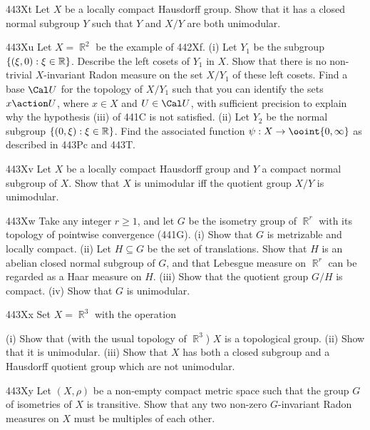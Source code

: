 {\spheader 443Xt Let $X$ be a locally compact Hausdorff group.   Show
that it has a closed normal subgroup $Y$ such that $Y$ and $X/Y$ are
both unimodular.   

\sqheader 443Xu Let $X=\BbbR^2$ be the example of 442Xf.   (i) Let
$Y_1$ be the subgroup $\{(\xi,0):\xi\in\Bbb R\}$.   Describe the left
cosets of $Y_1$ in $X$.   Show that there is no non-trivial
$X$-invariant Radon measure on the set $X/Y_1$ of these left cosets.
Find a base $\Cal U$ for the topology of $X/Y_1$ such that you can
identify the sets $x\action U$, where $x\in X$ and $U\in\Cal U$, with
sufficient precision to explain why the hypothesis (iii) of 441C is not
satisfied.  (ii) Let $Y_2$ be the normal subgroup
$\{(0,\xi):\xi\in\Bbb R\}$.   Find
the associated function $\psi:X\to\ooint{0,\infty}$ as described in
443Pc and 443T.

\spheader 443Xv Let $X$ be a locally compact Hausdorff group and $Y$ a
compact normal subgroup of $X$.   Show that $X$ is unimodular iff the
quotient group $X/Y$ is unimodular.   

\spheader 443Xw Take any integer $r\ge 1$, and let $G$ be the isometry
group of $\BbbR^r$ with its topology of pointwise convergence (441G).
(i) Show that $G$ is metrizable and locally compact.   
(ii) Let $H\subseteq G$ be the set of translations.   Show that
$H$ is an abelian closed normal subgroup of $G$, and that Lebesgue
measure on $\BbbR^r$ can be regarded as a Haar measure on $H$.   (iii)
Show that the quotient group $G/H$ is compact.   (iv) Show that $G$ is
unimodular.   

\sqheader 443Xx Set $X=\BbbR^3$ with the operation


\noindent (i) Show that (with the usual topology of $\BbbR^3$) $X$ is a
topological group.   (ii) Show that it is unimodular.   
(iii) Show that $X$ has both a closed subgroup and a
Hausdorff quotient group which are not unimodular.

\sqheader 443Xy Let $(X,\rho)$ be a non-empty compact metric space such
that the group $G$ of isometries of $X$ is transitive.   Show that any
two non-zero
$G$-invariant Radon measures on $X$ must be multiples of each other.

}

